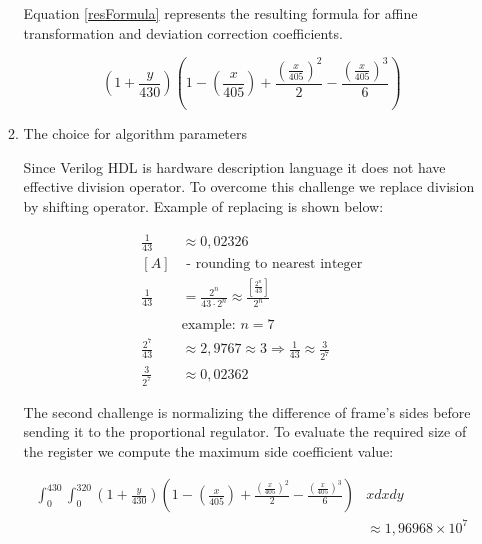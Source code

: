 \documentclass[a4paper,12pt]{article} %
\begin{document}
\begin{enumerate}
\begin{enumerate}
		Equation \eqref{resFormula} represents the resulting formula for affine transformation and deviation correction coefficients.

		\begin{equation}
			\left ( 1 + \frac{y}{430}\right )
			\left (  
			1 - \left ( \frac{x}{405}\right) + 
			\frac{\left ( \frac{x}{405}\right) ^2}{2}  -
			\frac{\left ( \frac{x}{405}\right)^3}{6}
			\right )
			\label{resFormula}
		\end{equation}
		\vspace{1cm}
		
		\item The choice for algorithm parameters
		
		Since Verilog HDL is hardware description language it does not have effective division operator. To overcome this challenge we replace division by shifting operator. Example of replacing is shown below:
		
 
		
		\begin{align*}
			\frac{1}{43} &\approx 0,02326 \\
			[A] &\text{ - rounding to nearest integer} \\
			\frac{1}{43} &= \frac{2^n}{43 \cdot 2^n} \approx \frac{\left [ \frac{2^n}{43} \right ]}{2^n} \\  \\
			&\text{example: } n = 7\\
			\frac{2^7}{43} &\approx 2,9767 \approx 3 \Rightarrow 
			\frac{1}{43} \approx \frac{3}{2^7} \\
			\frac{3}{2^7} &\approx 0,02362
		\end{align*}
		
		The second challenge is normalizing the difference of frame's sides before sending it to the proportional regulator. To evaluate the required size of the register we compute the maximum side coefficient value:
		
		
		\begin{equation}
		\begin{aligned}
			\int_0^{430} \int_0^{320} 
			\left ( 1 + \frac{y}{430}\right )
			\left (  
			1 - \left ( \frac{x}{405}\right) + 
			\frac{\left ( \frac{x}{405}\right) ^2}{2}  -
			\frac{\left ( \frac{x}{405}\right)^3}{6}
			\right )
			&x
			dx
			dy\\
			&\approx 1,96968 \times 10^7 
		\end{aligned}
		\end{equation}
		

\end{enumerate}
\end{enumerate}
\end{document}
